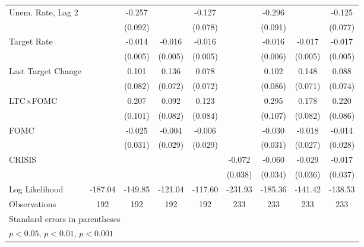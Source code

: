 \documentclass{article}
\begin{document}
{\begin{tabular}{l*{8}{c}}
Unem. Rate, Lag 2&                  &   -0.257\sym{**} &                  &   -0.127         &                  &   -0.296\sym{**} &                  &   -0.125         \\
                &                  &  (0.092)         &                  &  (0.078)         &                  &  (0.091)         &                  &  (0.077)         \\
Target Rate     &                  &   -0.014\sym{**} &   -0.016\sym{**} &   -0.016\sym{**} &                  &   -0.016\sym{**} &   -0.017\sym{**} &   -0.017\sym{***}\\
                &                  &  (0.005)         &  (0.005)         &  (0.005)         &                  &  (0.006)         &  (0.005)         &  (0.005)         \\
Last Target Change&                  &    0.101         &    0.136         &    0.078         &                  &    0.102         &    0.148\sym{*}  &    0.088         \\
                &                  &  (0.082)         &  (0.072)         &  (0.072)         &                  &  (0.086)         &  (0.071)         &  (0.074)         \\
LTC$\times$FOMC&                  &    0.207\sym{*}  &    0.092         &    0.123         &                  &    0.295\sym{**} &    0.178\sym{*}  &    0.220\sym{*}  \\
                &                  &  (0.101)         &  (0.082)         &  (0.084)         &                  &  (0.107)         &  (0.082)         &  (0.086)         \\
FOMC            &                  &   -0.025         &   -0.004         &   -0.006         &                  &   -0.030         &   -0.018         &   -0.014         \\
                &                  &  (0.031)         &  (0.029)         &  (0.029)         &                  &  (0.031)         &  (0.027)         &  (0.028)         \\
CRISIS          &                  &                  &                  &                  &   -0.072         &   -0.060         &   -0.029         &   -0.017         \\
                &                  &                  &                  &                  &  (0.038)         &  (0.034)         &  (0.036)         &  (0.037)         \\
\hline
Log Likelihood  &  -187.04         &  -149.85         &  -121.04         &  -117.60         &  -231.93         &  -185.36         &  -141.42         &  -138.53         \\
Observations    &      192         &      192         &      192         &      192         &      233         &      233         &      233         &      233         \\
\hline\hline
\multicolumn{9}{l}{\footnotesize Standard errors in parentheses}\\
\multicolumn{9}{l}{\footnotesize \sym{*} \(p<0.05\), \sym{**} \(p<0.01\), \sym{***} \(p<0.001\)}\\
\end{tabular}
}
\end{document}
